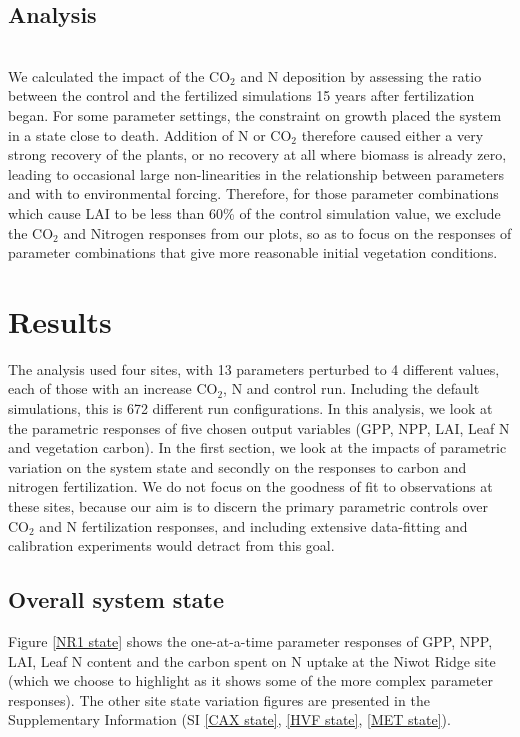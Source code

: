 \documentclass[draft,linenumbers]{agujournal}
\begin{document}
\subsection{Analysis}\\
We calculated the impact of the CO$_{2}$ and N deposition by assessing the ratio between the control and the fertilized simulations 15 years after fertilization began. For some parameter settings, the constraint on growth placed the system in a state close to death. Addition of N or CO$_{2}$ therefore caused either a very strong recovery of the plants, or no recovery at all where biomass is already zero, leading to occasional large non-linearities in the relationship between parameters and  with  to environmental forcing. Therefore, for those parameter combinations which cause LAI to be less than 60\% of the control simulation value, we exclude the CO$_{2}$ and Nitrogen responses from our plots, so as to focus on the responses of parameter combinations that give more reasonable initial vegetation conditions.

\section{Results}
The analysis used four sites, with 13 parameters perturbed to 4 different values, each of those with an increase CO$_{2}$, N and control run. Including the default simulations, this is 672 different run configurations. In this analysis, we look at the parametric responses of five chosen output variables (GPP, NPP, LAI, Leaf N and vegetation carbon). In the first section, we look at the impacts of parametric variation on the system state and secondly on the responses to carbon and nitrogen fertilization. We do not focus on the goodness of fit to observations at these sites, because our aim is to discern the primary parametric controls over CO$_{2}$ and N fertilization responses, and including extensive data-fitting and calibration experiments would detract from this goal. 

\subsection{Overall system state}
Figure \ref{NR1 state} shows the one-at-a-time parameter responses of GPP, NPP, LAI, Leaf N content and the carbon spent on N uptake at the Niwot Ridge site (which we choose to highlight as it shows some of the more complex parameter responses). The other site state variation figures are presented in the Supplementary Information (SI \ref{CAX state}, \ref{HVF state}, \ref{MET state}).
\end{document}
